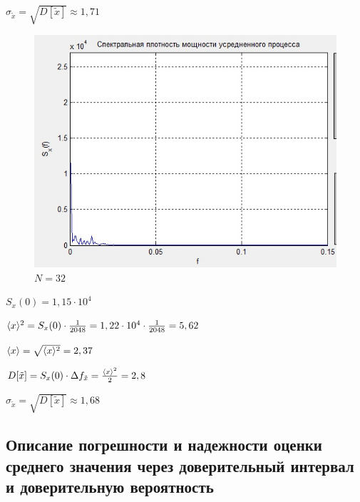 $\sigma_{\tilde{x}} = \sqrt{D[\tilde{x}]}\approx 1,71$
\begin{figure}[H]
	\centering
	\includegraphics[width=0.8\linewidth]{tasks/task5/realize3}
	\caption*{$N = 32$}
\end{figure}

$S_x(0)=1,15\cdot 10^4$

$\langle x\rangle^2 = S_x(0)\cdot \frac{1}{2048}= 1,22\cdot 10^4\cdot \frac{1}{2048} = 5,62$

$\langle x\rangle =  \sqrt{\langle x\rangle^2} = 2,37$

$D[\tilde{x}] = S_x(0)\cdot \Delta f_{\tilde{x}} =\frac{\langle x\rangle^2}{2} = 2,8$

$\sigma_{\tilde{x}} = \sqrt{D[\tilde{x}]}\approx 1,68$

\subsection[Задание 6]{Описание погрешности и надежности оценки среднего значения через доверительный интервал и доверительную вероятность}
